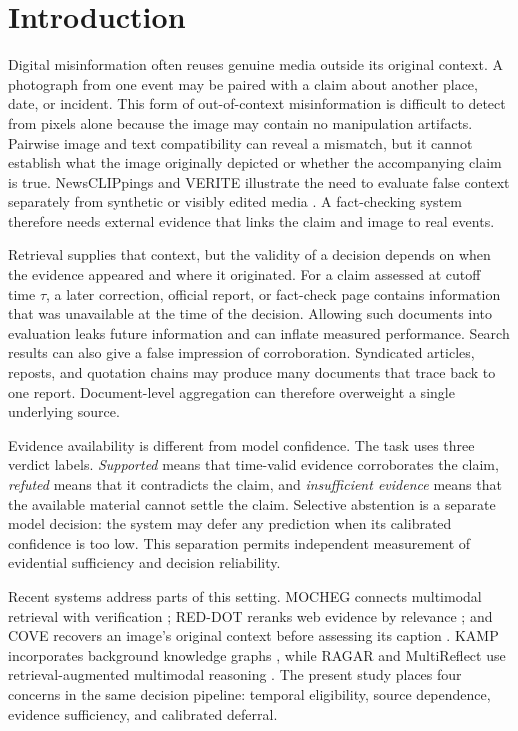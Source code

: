 \section{Introduction}

Digital misinformation often reuses genuine media outside its original context. A photograph from one event may be paired with a claim about another place, date, or incident. This form of out-of-context misinformation is difficult to detect from pixels alone because the image may contain no manipulation artifacts. Pairwise image and text compatibility can reveal a mismatch, but it cannot establish what the image originally depicted or whether the accompanying claim is true. NewsCLIPpings and VERITE illustrate the need to evaluate false context separately from synthetic or visibly edited media \cite{luo2021newsclippings,papadopoulos2024verite}. A fact-checking system therefore needs external evidence that links the claim and image to real events.

Retrieval supplies that context, but the validity of a decision depends on when the evidence appeared and where it originated. For a claim assessed at cutoff time $\tau$, a later correction, official report, or fact-check page contains information that was unavailable at the time of the decision. Allowing such documents into evaluation leaks future information and can inflate measured performance. Search results can also give a false impression of corroboration. Syndicated articles, reposts, and quotation chains may produce many documents that trace back to one report. Document-level aggregation can therefore overweight a single underlying source.

Evidence availability is different from model confidence. The task uses three verdict labels. \emph{Supported} means that time-valid evidence corroborates the claim, \emph{refuted} means that it contradicts the claim, and \emph{insufficient evidence} means that the available material cannot settle the claim. Selective abstention is a separate model decision: the system may defer any prediction when its calibrated confidence is too low. This separation permits independent measurement of evidential sufficiency and decision reliability.

Recent systems address parts of this setting. MOCHEG connects multimodal retrieval with verification \cite{yao2023mocheg}; RED-DOT reranks web evidence by relevance \cite{papadopoulos2025reddot}; and COVE recovers an image's original context before assessing its caption \cite{tonglet2025cove}. KAMP incorporates background knowledge graphs \cite{zhang2025kamp}, while RAGAR and MultiReflect use retrieval-augmented multimodal reasoning \cite{khaliq2024ragar,kangur2025multireflect}. The present study places four concerns in the same decision pipeline: temporal eligibility, source dependence, evidence sufficiency, and calibrated deferral.

